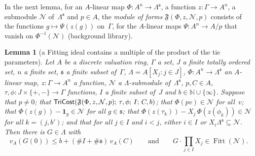 \documentclass[11pt,a4paper]{article}
\newcommand{\m}[1]{\mbox{$#1$}}        %
\theoremstyle{plainx}
\newtheorem{lemma}[theorem]{Lemma}
\theoremstyle{uprightx}
\newcommand{\NN}{\mathbb{N}}
\begin{document}
In the next lemma, for an $A$-linear map \m{\Phi\colon A^n\to\Lambda^{\mathfrak{s}}}, a function \m{z\colon\Gamma\to A^n}, a
submodule $\mathcal{N}$ of~$\Lambda^{\mathfrak{s}}$ and \m{p\in A}, the \emph{module of forms} \m{\mathfrak{F}(\Phi,z,\mathcal{N},p)}
consists of the functions \m{g\mapsto\Psi(z(g))} on~$\Gamma$, for the $A$-linear maps \m{\Psi\colon A^n\to A/p} that
vanish on \m{\Phi^{-1}(\mathcal{N})} (background library).

\begin{lemma}[a Fitting ideal contains a multiple of the product of the tie parameters]\label{l:block}
Let $A$ be a discrete valuation ring, $\Gamma$ a set, $J$ a finite totally ordered set, $n$ a finite set, $\mathfrak{s}$ a
finite subset of~$\Gamma$, \m{\Lambda=A[X_j:j\in J]}, \m{\Phi\colon A^n\to\Lambda^{\mathfrak{s}}} an $A$-linear map,
\m{z\colon\Gamma\to A^n} a function, $\mathcal{N}$ a $\Lambda$-submodule of~$\Lambda^{\mathfrak{s}}$, \m{p,C\in A},
\m{\tau,\phi\colon J\times\{+,-\}\to\Gamma} functions, $I$ a finite subset of~$J$ and \m{b\in\NN\cup\{\infty\}}.
Suppose that \m{p\ne0}; that \m{\HasTriangleCost{\mathfrak{F}(\Phi,z,\mathcal{N},p)}{\tau}{\phi}{I}{C}{b}}; that
\m{\Phi(pv)\in\mathcal{N}} for all~$v$; that \m{\Phi(z(g))-\mathbf{1}_g\in\mathcal{N}} for all \m{g\in \mathfrak{s}}; that
\m{\Phi(z(\tau_k))-X_j\,\Phi(z(\phi_k))\in\mathcal{N}} for all \m{k=(j,b')}; and that for all \m{j\in I} and \m{i<j},
either \m{i\in I} or \m{X_i\Lambda^{\mathfrak{s}}\subseteq\mathcal{N}}. Then there is \m{G\in\Lambda} with
\[
v_A(G(0))\le b+(\#I+\#\mathfrak{s})\,v_A(C)\qquad\text{and}\qquad G\cdot\prod_{j\in I}X_j\in\operatorname{Fitt}(\mathcal{N}).
\]
\end{lemma}
\end{document}
